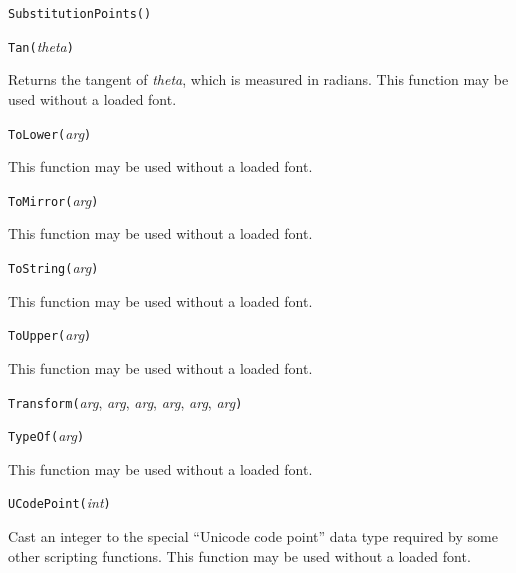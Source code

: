 \texttt{SubstitutionPoints(}\texttt{)}



\texttt{Tan(}\textit{theta}\texttt{)}

Returns the tangent of \textit{theta}, which is measured in radians.
This function may be used without a loaded font.



\texttt{ToLower(}\textit{arg}\texttt{)}

This function may be used without a loaded font.



\texttt{ToMirror(}\textit{arg}\texttt{)}

This function may be used without a loaded font.



\texttt{ToString(}\textit{arg}\texttt{)}

This function may be used without a loaded font.



\texttt{ToUpper(}\textit{arg}\texttt{)}

This function may be used without a loaded font.



\texttt{Transform(}\textit{arg}, \textit{arg}, \textit{arg}, \textit{arg}, \textit{arg}, \textit{arg}\texttt{)}



\texttt{TypeOf(}\textit{arg}\texttt{)}

This function may be used without a loaded font.



\texttt{UCodePoint(}\textit{int}\texttt{)}

Cast an integer to the special ``Unicode code point'' data type required by
some other scripting functions.  This function may be used without a loaded
font.

